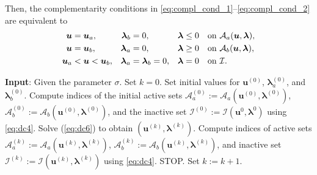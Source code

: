 \documentclass[a4paper,10pt]{article}
\numberwithin{theorem}{section}
\begin{document}
Then, the complementarity conditions in \eqref{eq:compl_cond_1}--\eqref{eq:compl_cond_2} are equivalent to
\begin{subequations}\label{eq:dc5}
    \begin{align}
    \boldsymbol{u} &=\boldsymbol{u}_a, & \boldsymbol{\lambda}_b &=0, & \boldsymbol{\lambda} &\leq 0 && \hbox{on  }  \mathcal{A}_a(\boldsymbol{u}, \boldsymbol{\lambda}), \\
    \boldsymbol{u} &=\boldsymbol{u}_b,& \boldsymbol{\lambda}_a &=0, & \boldsymbol{\lambda} &\geq 0 && \hbox{on  }  \mathcal{A}_b(\boldsymbol{u}, \boldsymbol{\lambda}), \\
    \boldsymbol{u}_a &< \boldsymbol{u} < \boldsymbol{u}_b,& \boldsymbol{\lambda}_a&=\boldsymbol{\lambda}_b=0,& \boldsymbol{\lambda} &=0 &&\hbox{on  }  \mathcal{I}.
\end{align}
\end{subequations}

\begin{algorithm}[htp!]
\caption{Primal-dual active set (PDAS) strategy}
\label{Alg:pdas}
\begin{algorithmic}[lines]
    \STATE \textbf{Input}: Given the parameter $\sigma$.
    \STATE Set $k=0$.
    \STATE Set initial values for $\boldsymbol{u}^{(0)}$, $\boldsymbol{\lambda}_a^{(0)}$, and $\boldsymbol{\lambda}_b^{(0)}$.
    \STATE Compute indices of  the initial active sets  $\mathcal{A}_a^{(0)} := \mathcal{A}_a(\boldsymbol{u}^{(0)}, \boldsymbol{\lambda}^{(0)})$, $\mathcal{A}_b^{(0)}:=\mathcal{A}_b(\boldsymbol{u}^{(0)}, \boldsymbol{\lambda}^{(0)})$, 
          and the inactive set  $\mathcal{I}^{(0)}:=\mathcal{I}(\boldsymbol{u}^0, \boldsymbol{\lambda}^0)$ using \eqref{eq:dc4}.
        \STATE Solve (\ref{eq:dc6}) to obtain  $(\boldsymbol{u}^{(k)},\boldsymbol{\lambda}^{(k)})$.
        \STATE Compute indices of  active sets  $\mathcal{A}_a^{(k)} :=\mathcal{A}_a(\boldsymbol u^{(k)}, \boldsymbol{\lambda}^{(k)})$, $\mathcal{A}_b^{(k)}:= \mathcal{A}_b(\boldsymbol u^{(k)}, \boldsymbol{\lambda}^{(k)})$, and inactive set  $\mathcal{I}^{(k)}:=\mathcal{I}(\boldsymbol u^{(k)},\boldsymbol{\lambda}^{(k)})$ using \eqref{eq:dc4}.
            \STATE STOP.
        \ENDIF
        \STATE Set $k:=k+1$.
    \ENDFOR
\end{algorithmic}
\end{algorithm}
\end{document}
